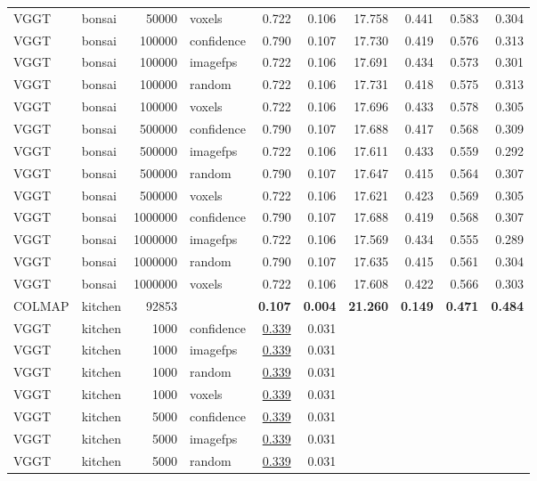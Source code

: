 \begin{table}[H]
\begin{tabular}{llrlrrrrrr}
VGGT & bonsai & 50000 & voxels & 0.722 & 0.106 & 17.758 & 0.441 & 0.583 & 0.304 \\
VGGT & bonsai & 100000 & confidence & 0.790 & 0.107 & 17.730 & 0.419 & 0.576 & 0.313 \\
VGGT & bonsai & 100000 & imagefps & 0.722 & 0.106 & 17.691 & 0.434 & 0.573 & 0.301 \\
VGGT & bonsai & 100000 & random & 0.722 & 0.106 & 17.731 & 0.418 & 0.575 & 0.313 \\
VGGT & bonsai & 100000 & voxels & 0.722 & 0.106 & 17.696 & 0.433 & 0.578 & 0.305 \\
VGGT & bonsai & 500000 & confidence & 0.790 & 0.107 & 17.688 & 0.417 & 0.568 & 0.309 \\
VGGT & bonsai & 500000 & imagefps & 0.722 & 0.106 & 17.611 & 0.433 & 0.559 & 0.292 \\
VGGT & bonsai & 500000 & random & 0.790 & 0.107 & 17.647 & 0.415 & 0.564 & 0.307 \\
VGGT & bonsai & 500000 & voxels & 0.722 & 0.106 & 17.621 & 0.423 & 0.569 & 0.305 \\
VGGT & bonsai & 1000000 & confidence & 0.790 & 0.107 & 17.688 & 0.419 & 0.568 & 0.307 \\
VGGT & bonsai & 1000000 & imagefps & 0.722 & 0.106 & 17.569 & 0.434 & 0.555 & 0.289 \\
VGGT & bonsai & 1000000 & random & 0.790 & 0.107 & 17.635 & 0.415 & 0.561 & 0.304 \\
VGGT & bonsai & 1000000 & voxels & 0.722 & 0.106 & 17.608 & 0.422 & 0.566 & 0.303 \\
\midrule
COLMAP & kitchen & 92853 &  & \textbf{0.107} & \textbf{0.004} & \textbf{21.260} & \textbf{0.149} & \textbf{0.471} & \textbf{0.484} \\
VGGT & kitchen & 1000 & confidence & \underline{0.339} & 0.031 &  &  &  &  \\
VGGT & kitchen & 1000 & imagefps & \underline{0.339} & 0.031 &  &  &  &  \\
VGGT & kitchen & 1000 & random & \underline{0.339} & 0.031 &  &  &  &  \\
VGGT & kitchen & 1000 & voxels & \underline{0.339} & 0.031 &  &  &  &  \\
VGGT & kitchen & 5000 & confidence & \underline{0.339} & 0.031 &  &  &  &  \\
VGGT & kitchen & 5000 & imagefps & \underline{0.339} & 0.031 &  &  &  &  \\
VGGT & kitchen & 5000 & random & \underline{0.339} & 0.031 &  &  &  &  \\

\end{tabular}
\end{table}
